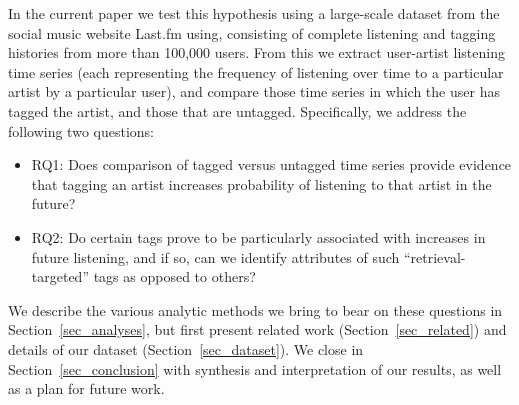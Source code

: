 In the current paper we test this hypothesis using a large-scale dataset from the social music website Last.fm using, consisting of complete listening and tagging histories from more than 100,000 users. From this we extract user-artist listening time series (each representing the frequency of listening over time to a particular artist by a particular user), and compare those time series in which the user has tagged the artist, and those that are untagged. Specifically, we address the following two questions:
\begin{itemize}
	\item RQ1: Does comparison of tagged versus untagged time series provide evidence that tagging an artist increases probability of listening to that artist in the future?
	\item RQ2: Do certain tags prove to be particularly associated with increases in future listening, and if so, can we identify attributes of such ``retrieval-targeted'' tags as opposed to others?
\end{itemize}

We describe the various analytic methods we bring to bear on these questions in Section~\ref{sec_analyses}, but first present related work (Section~\ref{sec_related}) and details of our dataset (Section~\ref{sec_dataset}). We close in Section~\ref{sec_conclusion} with synthesis and interpretation of our results, as well as a plan for future work.